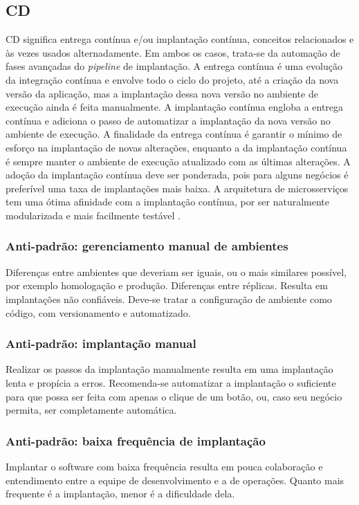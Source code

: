 \subsection{CD}
CD significa entrega contínua e/ou implantação contínua, conceitos relacionados e às vezes usados alternadamente. Em ambos os casos, trata-se da automação de fases avançadas do \emph{pipeline} de implantação. A entrega contínua é uma evolução da integração contínua e envolve todo o ciclo do projeto, até a criação da nova versão da aplicação, mas a implantação dessa nova versão no ambiente de execução ainda é feita manualmente. A implantação contínua engloba a entrega contínua e adiciona o passo de automatizar a implantação da nova versão no ambiente de execução. A finalidade da entrega contínua é garantir o mínimo de esforço na implantação de novas alterações, enquanto a da implantação contínua é sempre manter o ambiente de execução atualizado com as últimas alterações. A adoção da implantação contínua deve ser ponderada, pois para alguns negócios é preferível uma taxa de implantações mais baixa. A arquitetura de microsserviços tem uma ótima afinidade com a implantação contínua, por ser naturalmente modularizada e mais facilmente testável \cite{gitlab-ci-cd,redhat-ci-cd}.

\subsubsection{Anti-padrão: gerenciamento manual de ambientes}
Diferenças entre ambientes que deveriam ser iguais, ou o mais similares possível, por exemplo homologação e produção. Diferenças entre réplicas. Resulta em implantações não confiáveis. Deve-se tratar a configuração de ambiente como código, com versionamento e automatizado. \cite{continuous-delivery-jez-humble}

\subsubsection{Anti-padrão: implantação manual}
Realizar os passos da implantação manualmente resulta em uma implantação lenta e propícia a erros. Recomenda-se automatizar a implantação o suficiente para que possa ser feita com apenas o clique de um botão, ou, caso seu negócio permita, ser completamente automática. \cite{continuous-delivery-jez-humble}

\subsubsection{Anti-padrão: baixa frequência de implantação}
Implantar o software com baixa frequência resulta em pouca colaboração e entendimento entre a equipe de desenvolvimento e a de operações. Quanto mais frequente é a implantação, menor é a dificuldade dela. \cite{continuous-delivery-jez-humble, martin-fowler-frequency}

